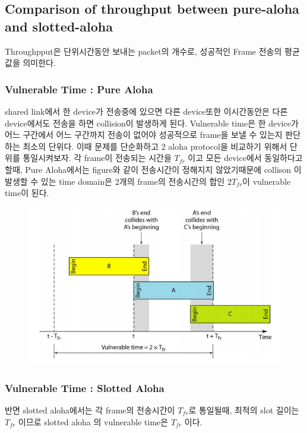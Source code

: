 \subsection{Comparison of throughput between pure-aloha and slotted-aloha}
Throughpput은 단위시간동안 보내는 packet의 개수로, 성공적인 Frame 전송의 평균값을 의미한다.
\vspace{-4mm}
\subsubsection*{Vulnerable Time : Pure Aloha}
\vspace{-2mm}
shared link에서 한 device가 전송중에 있으면 다른 device또한 이시간동안은 다른 device에서도 전송을 하면 collision이 발생하게 된다. Vulnerable time은 한 device가 어느 구간에서 어느 구간까지 전송이 없어야 성공적으로 frame을 보낼 수 있는지 판단하는 최소의 단위다.
이때 문제를 단순화하고 2 aloha protocol을 비교하기 위해서 단위를 통일시켜보자. 각 frame이 전송되는 시간을 $T_{fr}$  이고 모든 device에서 동일하다고 할때, Pure Aloha에서는  figure와 같이 전송시간이 정해지지 않았기때문에 collison 이 발생할 수 있는 time domain은 2개의 frame의 전송시간의 합인 $2T_{fr}$이 vulnerable time이 된다.
\vspace{-4mm}  
    \begin{figure}[!h]\centering
		\includegraphics[width=.55\textwidth]{image/week12/1-3.png}
		\vspace{-10pt}
    \end{figure}
\vspace{-4mm}
\subsubsection*{Vulnerable Time : Slotted Aloha}
\vspace{-2mm}
반면 slotted aloha에서는 각 frame의 전송시간이 $T_{fr}$로 통일될때, 최적의 slot 길이는 $T_{fr}$ 이므로 slotted aloha 의 vulnerable time은 $T_{fr}$ 이다. 
\vspace{-2mm}
